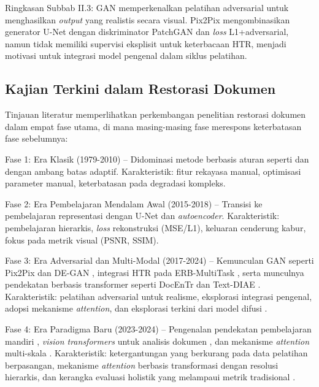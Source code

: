 \documentclass[12pt,a4paper]{article}
\begin{document}
Ringkasan Subbab II.3: GAN memperkenalkan pelatihan adversarial untuk menghasilkan \textit{output} yang realistis secara visual. Pix2Pix mengombinasikan generator U-Net dengan diskriminator PatchGAN dan \textit{loss} L1+adversarial, namun tidak memiliki supervisi eksplisit untuk keterbacaan HTR, menjadi motivasi untuk integrasi model pengenal dalam siklus pelatihan.


\subsection{Kajian Terkini dalam Restorasi Dokumen}
\label{subsec:sota-analysis}


Tinjauan literatur memperlihatkan perkembangan penelitian restorasi dokumen dalam empat fase utama, di mana masing-masing fase merespons keterbatasan fase sebelumnya:

Fase 1: Era Klasik (1979-2010) -- Didominasi metode berbasis aturan seperti \parencite{otsu1979} dan \parencite{sauvola2000} dengan ambang batas adaptif. Karakteristik: fitur rekayasa manual, optimisasi parameter manual, keterbatasan pada degradasi kompleks.

Fase 2: Era Pembelajaran Mendalam Awal (2015-2018) -- Transisi ke pembelajaran representasi dengan U-Net \parencite{ronneberger2015} dan \textit{autoencoder}. Karakteristik: pembelajaran hierarkis, \textit{loss} rekonstruksi (MSE/L1), keluaran cenderung kabur, fokus pada metrik visual (PSNR, SSIM).

Fase 3: Era Adversarial dan Multi-Modal (2017-2024) -- Kemunculan GAN seperti Pix2Pix \parencite{isola2017} dan DE-GAN \parencite{souibgui2021}, integrasi HTR pada ERB-MultiTask \parencite{erb2021}, serta munculnya pendekatan berbasis transformer seperti DocEnTr \parencite{docentr2022} dan Text-DIAE \parencite{textdiae2022}. Karakteristik: pelatihan adversarial untuk realisme, eksplorasi integrasi pengenal, adopsi mekanisme \textit{attention}, dan eksplorasi terkini dari model difusi \parencite{chen2024diffusion}.

Fase 4: Era Paradigma Baru (2023-2024) -- Pengenalan pendekatan pembelajaran mandiri \parencite{zhang2024}, \textit{vision transformers} untuk analisis dokumen \parencite{kiessling2023}, dan mekanisme \textit{attention} multi-skala \parencite{martinez2024}. Karakteristik: ketergantungan yang berkurang pada data pelatihan berpasangan, mekanisme \textit{attention} berbasis transformasi dengan resolusi hierarkis, dan kerangka evaluasi holistik yang melampaui metrik tradisional \parencite{thompson2023}.
\end{document}
